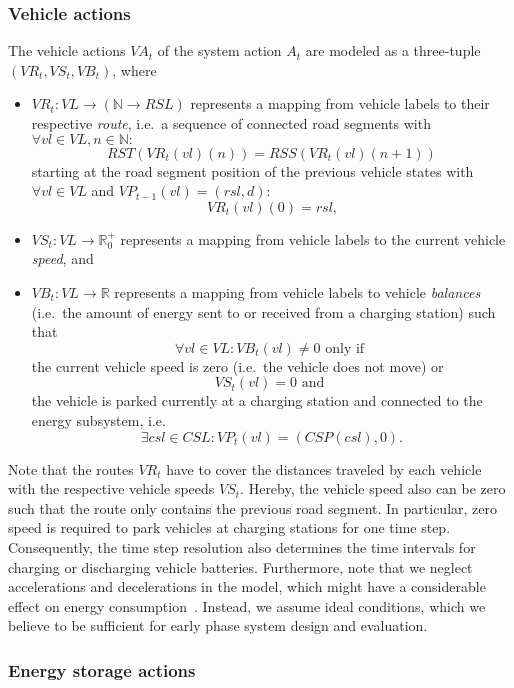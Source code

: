\subsubsection{Vehicle actions}
\label{actions_vehicles}

The vehicle actions $VA_t$ of the system action $A_t$ are modeled as a three-tuple $(VR_t, VS_t, VB_t)$, where
\begin{itemize}
	\item $VR_t: VL \rightarrow (\mathbb{N} \rightarrow RSL)$ represents a mapping from vehicle labels to their respective \textit{route}, i.e.\ a sequence of connected road segments with $\forall vl \in VL, n \in \mathbb{N}:$
	\[
		RST(VR_t(vl)(n)) = RSS(VR_t(vl)(n + 1))
	\]
	starting at the road segment position of the previous vehicle states with $\forall vl \in VL$ and $VP_{t-1}(vl) = (rsl, d):$
	\[
		VR_t(vl)(0) = rsl \textrm{,}
	\]
	\item $VS_t: VL \rightarrow \mathbb{R}_0^+$ represents a mapping from vehicle labels to the current vehicle \textit{speed}, and
	\item $VB_t: VL \rightarrow \mathbb{R}$ represents a mapping from vehicle labels to vehicle \textit{balances} (i.e.\ the amount of energy sent to or received from a charging station) such that
	\[
		\forall vl \in VL: VB_t(vl) \neq 0 \textrm{ only if }
	\]
	the current vehicle speed is zero (i.e.\ the vehicle does not move) or
	\[
		 VS_t(vl) = 0 \textrm{ and }
	\]
	the vehicle is parked currently at a charging station and connected to the energy subsystem, i.e.\
	\[
		\exists csl \in CSL: VP_t(vl) = (CSP(csl), 0) \textrm{.}
	\]
\end{itemize}
Note that the routes $VR_t$ have to cover the distances traveled by each vehicle with the respective vehicle speeds $VS_t$. Hereby, the vehicle speed also can be zero such that the route only contains the previous road segment. In particular, zero speed is required to park vehicles at charging stations for one time step. Consequently, the time step resolution also determines the time intervals for charging or discharging vehicle batteries. Furthermore, note that we neglect accelerations and decelerations in the model, which might have a considerable effect on energy consumption~\cite{?}. Instead, we assume ideal conditions, which we believe to be sufficient for early phase system design and evaluation.

\subsubsection{Energy storage actions}
\label{actions_storages}

